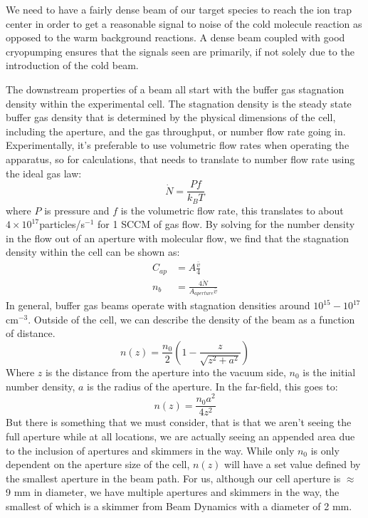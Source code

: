We need to have a fairly dense beam of our target species to reach the ion trap center in order to get a reasonable signal to noise of the cold molecule reaction as opposed to the warm background reactions. A dense beam coupled with good cryopumping ensures that the signals seen are primarily, if not solely due to the introduction of the cold beam.

The downstream properties of a beam all start with the buffer gas stagnation density within the experimental cell. The stagnation density is the steady state buffer gas density that is determined by the physical dimensions of the cell, including the aperture, and the gas throughput, or number flow rate going in. Experimentally, it's preferable to use volumetric flow rates when operating the apparatus, so for calculations, that needs to translate to number flow rate using the ideal gas law:
\begin{equation*}
	\dot{N} = \frac{P f}{k_B T}
\end{equation*}
where $P$ is pressure and $f$ is the volumetric flow rate, this translates to about $4\times10^{17}$particles/s$^{-1}$ for 1 SCCM of gas flow. By solving for the number density in the flow out of an aperture with molecular flow, we find that the stagnation density within the cell can be shown as:
\begin{align}
	C_{ap} & = A \frac{\bar{v}}{4} \nonumber \\
	n_{b} & = \frac{4 \dot{N}}{A_{aperture} \bar{v}} \label{eq: n_b}
\end{align}
In general, buffer gas beams operate with stagnation densities around $10^{15}-10^{17}$cm$^{-3}$. Outside of the cell, we can describe the density of the beam as a function of distance. \cite{Pauly}
\begin{equation}
	n(z)=\frac{n_0}{2}\left(1-\frac{z}{\sqrt{z^2+a^2}}\right)
	\label{eq: n(z)}
\end{equation}
Where $z$ is the distance from the aperture into the vacuum side, $n_0$ is the initial number density, $a$ is the radius of the aperture. In the far-field, this goes to:
\begin{equation*}
	n(z)=\frac{n_0 a^2}{4 z^2}
\end{equation*}
But there is something that we must consider, that is that we aren't seeing the full aperture while at all locations, we are actually seeing an appended area due to the inclusion of apertures and skimmers in the way. While only $n_0$ is only dependent on the aperture size of the cell, $n(z)$ will have a set value defined by the smallest aperture in the beam path. For us, although our cell aperture is $\approx$ 9 mm in diameter, we have multiple apertures and skimmers in the way, the smallest of which is a skimmer from Beam Dynamics with a diameter of 2 mm.


